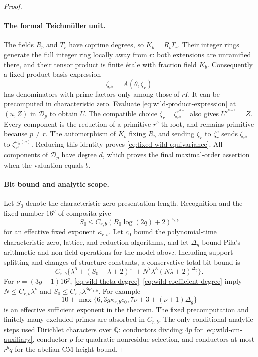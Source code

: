 \documentclass[11pt]{article}
\theoremstyle{definition}
\theoremstyle{remark}
\begin{document}
\begin{proof}
\paragraph{The formal Teichm\"uller unit.}
The fields \(R_b\) and \(T_r\) have coprime degrees, so
\(K_b=R_bT_r\). Their integer rings generate the full integer
ring locally away from \(r\): both extensions are unramified
there, and their tensor product is finite \'etale with fraction
field \(K_b\). Consequently a fixed product-basis expression
\begin{equation}
                         \zeta_{r^b}=A(\theta,\zeta_r)
 \label{eq:wild-product-expression}
\end{equation}
has denominators with prime factors only among those of \(rI\).
It can be precomputed in characteristic zero. Evaluate \eqref{eq:wild-product-expression} at
\((u,Z)\) in \(\mathcal D_p\) to obtain \(U\).
The compatible choice \(\zeta_r=\zeta_{r^b}^{r^{b-1}}\)
also gives \(U^{r^{b-1}}=Z\). Every component is the
reduction of a primitive \(r^b\)-th root, and remains
primitive because \(p\ne r\).
The automorphism of \(K_b\) fixing \(R_b\) and sending
\(\zeta_r\) to \(\zeta_r^c\) sends \(\zeta_{r^b}\) to
\(\zeta_{r^b}^{\omega_b(c)}\). Reducing this identity proves
\eqref{eq:fixed-wild-equivariance}. All components of
\(\mathcal D_p\) have degree \(d\), which proves the final
maximal-order assertion when the valuation equals \(b\).

\paragraph{Bit bound and analytic scope.}
Let \(S_0\) denote the characteristic-zero presentation length.
Recognition and the fixed number \(16^g\) of composita give
\[
 S_0\leq C_{r,b}(B_0\log(2q)+2)^{\kappa_{r,b}}
\]
for an effective fixed exponent \(\kappa_{r,b}\).
Let \(c_0\) bound the polynomial-time characteristic-zero,
lattice, and reduction algorithms, and let \(\Delta_g\)
bound Pila's arithmetic and non-field operations for the model
above. Including support splitting and changes of structure
constants, a conservative total bit bound is
\begin{equation}
 C_{r,b}\{\lambda^6+(S_0+\lambda+2)^{c_0}
                   +N^7\lambda^3(N\lambda+2)^{\Delta_g}\}.
 \label{eq:wild-fixed-bit-bound}
\end{equation}
For \(\nu=(3g-1)16^g\), \eqref{eq:wild-theta-degree}--\eqref{eq:wild-coefficient-degree} imply
\(N\leq C_{r,b}\lambda^\nu\) and
\(S_0\leq C_{r,b}\lambda^{3g\kappa_{r,b}}\).
For example
\[
 10+\max\{6,3g\kappa_{r,b}c_0,
                  7\nu+3+(\nu+1)\Delta_g\}
\]
is an effective sufficient exponent in the theorem.
The fixed precomputation and finitely many excluded primes
are absorbed in \(C_{r,b}\).
The only conditional analytic steps used Dirichlet characters
over \(\mathbb Q\): conductors dividing \(4p\) for \eqref{eq:wild-cm-auxiliary},
conductor \(p\) for quadratic nonresidue selection, and
conductors at most \(r^bq\) for the abelian CM height bound.
\end{proof}
\end{document}
